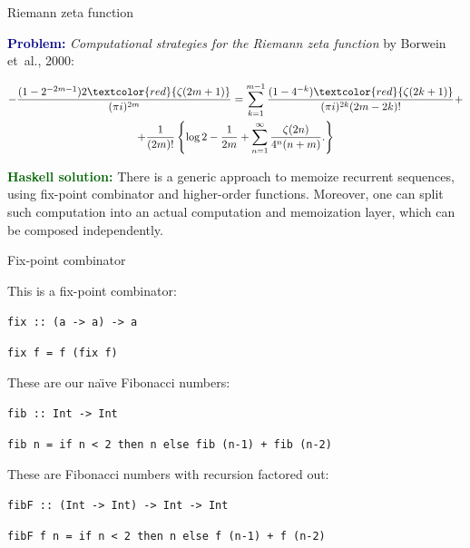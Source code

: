 \documentclass[handout]{beamer}
\def\problem{\textcolor{darkblue}{\bf Problem:} }
\def\solution{\textcolor{darkgreen}{\bf Haskell solution:} }
\begin{document}
\begin{frame}{Riemann zeta function}

\problem
{\em Computational strategies for the Riemann zeta function}
by Borwein et~al., 2000:

\begin{multline*}
- \frac{(1-2^{-2m-1}) 2 \textcolor{red}{\zeta(2m+1)}}{ (\pi i)^{2m}}
=
\sum_{k=1}^{m-1} \frac{(1-4^{-k}) \textcolor{red}{\zeta(2k+1)}}{(\pi i)^{2k} (2m-2k)! }
+ \\ +
\frac{1}{(2m)!} \left\{
  \log 2 - \frac{1}{2m} + \sum_{n=1}^\infty \frac{\zeta(2n)}{4^n (n+m)}.
\right\}
\end{multline*}

\pause

\solution
There is a generic approach to memoize recurrent sequences,
using fix-point combinator and higher-order functions.
Moreover, one can split such computation into
an actual computation and memoization layer,
which can be composed independently.

\end{frame}

\begin{frame}{Fix-point combinator}

This is a fix-point combinator:

\medskip

{\tt fix :: (a -> a) -> a} \par
{\tt fix f = f (fix f) }

\medskip

\pause

These are our na\"{\i}ve Fibonacci numbers:

\medskip

  {\tt fib :: Int -> Int } \par
  {\tt fib n = if n < 2 then n else fib (n-1) + fib (n-2) }

\medskip

\pause

These are Fibonacci numbers with recursion factored out:

\medskip

{\tt fibF :: (Int -> Int) -> Int -> Int} \par
{\tt fibF f n = if n < 2 then n else f (n-1) + f (n-2)}

\end{frame}
\end{document}
